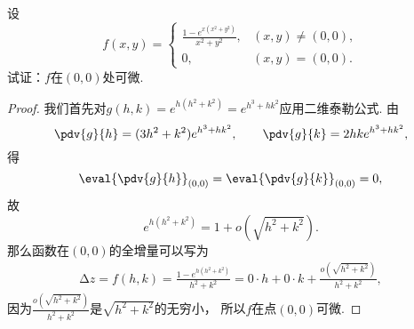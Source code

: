 \begin{example}
设\begin{equation*}
	f(x,y) = \begin{cases}
		\frac{1 - e^{x(x^2+y^2)}}{x^2+y^2}, & (x,y)\neq(0,0), \\
		0, & (x,y)=(0,0).
	\end{cases}
\end{equation*}试证：\(f\)在\((0,0)\)处可微.
\begin{proof}
我们首先对\(g(h,k) = e^{h(h^2+k^2)} = e^{h^3+hk^2}\)应用二维泰勒公式.
由\begin{equation*}
	\pdv{g}{h} = (3h^2+k^2)e^{h^3+hk^2}, \qquad
	\pdv{g}{k} = 2hke^{h^3+hk^2},
\end{equation*}得\begin{equation*}
	\eval{\pdv{g}{h}}_{(0,0)}
	= \eval{\pdv{g}{k}}_{(0,0)}
	= 0,
\end{equation*}
故\begin{equation*}
	e^{h(h^2+k^2)} = 1 + o(\sqrt{h^2+k^2}).
\end{equation*}
那么函数在\((0,0)\)的全增量可以写为
\begin{align*}
	\increment z
	= f(h,k)
	= \frac{1 - e^{h(h^2+k^2)}}{h^2+k^2}
	= 0 \cdot h + 0 \cdot k + \frac{o(\sqrt{h^2+k^2})}{h^2+k^2},
\end{align*}
因为\(\frac{o(\sqrt{h^2+k^2})}{h^2+k^2}\)是\(\sqrt{h^2+k^2}\)的无穷小，
所以\(f\)在点\((0,0)\)可微.
\end{proof}
\end{example}

